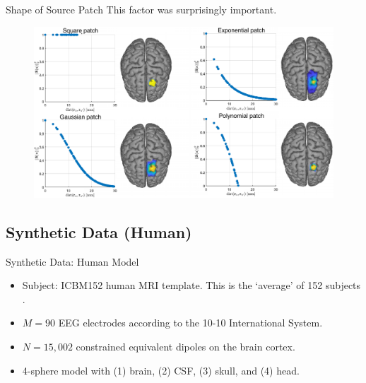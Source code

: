 \documentclass[progressbar=head]{beamer}
\begin{document}
\begin{frame}{Shape of Source Patch}
This factor was surprisingly important.
\begin{figure}
\centering
\includegraphics[width=0.8\linewidth]{./img/profiles.pdf}
\end{figure}
\end{frame}

{
\subsection{Synthetic Data (Human)}
}

\begin{frame}{Synthetic Data: Human Model}
\begin{itemize}
\item Subject: ICBM152 human MRI template. This is the `average' of 152 subjects \cite{icbm152_2011}.
\item $M=90$ EEG electrodes according to the 10-10 International System.
\item $N=15,002$ constrained equivalent dipoles on the brain cortex.
\item 4-sphere model with (1) brain, (2) CSF, (3) skull, and (4) head. 
\end{itemize}
\end{frame}
\end{document}
